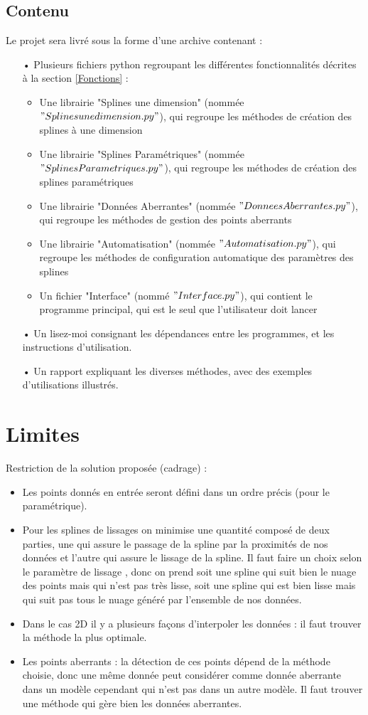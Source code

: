 \documentclass[a4paper,12pt]{article}
\begin{document}
\subsection*{Contenu}
Le projet sera livré sous la forme d'une archive contenant :
\begin{itemize}
\item[•] Plusieurs fichiers python regroupant les différentes fonctionnalités décrites à la section \ref{Fonctions}  : 
\begin{itemize}
\item Une librairie "Splines une dimension" (nommée $"Splinesune dimension.py"$), qui regroupe les méthodes de création des splines à une dimension
\item Une librairie "Splines Paramétriques" (nommée $"SplinesParametriques.py"$), qui regroupe les méthodes de création des splines paramétriques
\item Une librairie "Données Aberrantes" (nommée $"DonneesAberrantes.py"$), qui regroupe les méthodes de gestion des points aberrants
\item Une librairie "Automatisation" (nommée $"Automatisation.py"$), qui regroupe les méthodes de configuration automatique des paramètres des splines
\item Un fichier "Interface" (nommé $"Interface.py"$), qui contient le programme principal, qui est le seul que l'utilisateur doit lancer
\end{itemize}
\item[•] Un lisez-moi consignant les dépendances entre les programmes, et les instructions d'utilisation.
\item[•] Un rapport expliquant les diverses méthodes, avec des exemples d’utilisations illustrés.
\end{itemize}

\newpage
\section{Limites}

Restriction de la solution proposée (cadrage) :
\begin{itemize}
\item Les points donnés en entrée seront défini dans un ordre précis (pour le paramétrique).
\item Pour les splines de lissages on minimise une quantité composé de deux parties, une qui assure le passage de la spline par la proximités de nos données et l’autre qui assure le lissage de la spline. Il faut faire un choix selon le paramètre de lissage , donc on prend soit une spline qui suit bien le nuage des points mais qui n’est pas très lisse, soit une spline qui est bien lisse mais qui suit pas tous le nuage généré par l’ensemble de nos données.
\item Dans le cas 2D il y a plusieurs façons d’interpoler les données : il faut trouver la méthode la plus optimale.
\item Les points aberrants : la détection de ces points dépend de la méthode choisie, donc une même donnée peut considérer comme donnée aberrante dans un modèle cependant qui n’est pas dans un autre modèle. Il faut trouver une méthode qui gère bien les données aberrantes.
\end{itemize}
\end{document}
